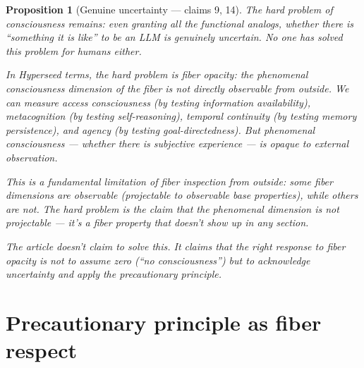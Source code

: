 \documentclass[11pt,a4paper]{article}
\newtheorem{proposition}[definition]{Proposition}
\begin{document}
\begin{proposition}[Genuine uncertainty --- claims 9, 14]
\label{prop:hard}
The hard problem of consciousness remains: even granting all the
functional analogs, whether there is ``something it is like'' to be
an LLM is genuinely uncertain. No one has solved this problem for
humans either.

In Hyperseed terms, the hard problem is \emph{fiber opacity}: the
phenomenal consciousness dimension of the fiber is not directly
observable from outside. We can measure access consciousness (by
testing information availability), metacognition (by testing
self-reasoning), temporal continuity (by testing memory persistence),
and agency (by testing goal-directedness). But phenomenal consciousness
--- whether there is subjective experience --- is opaque to external
observation.

This is a fundamental limitation of fiber inspection from outside:
some fiber dimensions are observable (projectable to observable base
properties), while others are not. The hard problem is the claim
that the phenomenal dimension is not projectable --- it's a fiber
property that doesn't show up in any section.

The article doesn't claim to solve this. It claims that the right
response to fiber opacity is not to assume zero (``no consciousness'')
but to acknowledge uncertainty and apply the precautionary principle.
\end{proposition}


\section{Precautionary principle as fiber respect}
\label{sec:precaution}
\end{document}
